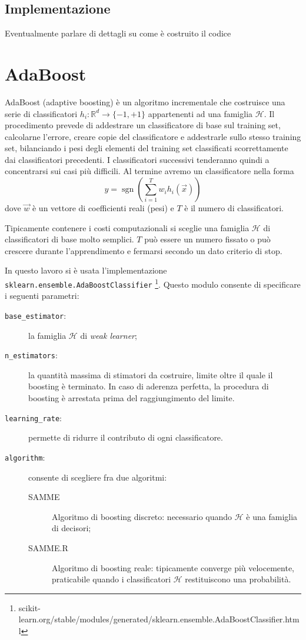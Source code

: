 \documentclass[12pt,a4paper,oneside,hidelinks]{report}
\DeclareMathOperator{\sgn}{sgn}
\begin{document}
\subsection{Implementazione}
Eventualmente parlare di dettagli su come è costruito il codice

\section{AdaBoost}
AdaBoost (adaptive boosting) è un algoritmo incrementale che costruisce una serie di classificatori $ h_{i}:\mathbb{R}^{d}\rightarrow \{-1,+1\} $ appartenenti ad una famiglia $ \mathcal{H} $. 
Il procedimento prevede di addestrare un classificatore di base sul training set, calcolarne l'errore, creare copie del classificatore e addestrarle sullo stesso training set, bilanciando i pesi degli elementi del training set classificati scorrettamente dai classificatori precedenti. I classificatori successivi tenderanno quindi a concentrarsi sui casi più difficili.
Al termine avremo un classificatore nella forma
\[\hat{y}=\sgn(\sum_{i=1}^{T} w_{i}h_{i}(\vec{x}))\]
dove $ \vec{w} $ è un vettore di coefficienti reali (pesi) e $ T $ è il numero di classificatori.

Tipicamente contenere i costi computazionali si sceglie una famiglia $ \mathcal{H} $ di classificatori di base molto semplici. $ T $ può essere un numero fissato o può crescere durante l'apprendimento e fermarsi secondo un dato criterio di stop.

In questo lavoro si è usata l'implementazione \texttt{sklearn.ensemble.AdaBoostClassifier}
\footnote{scikit-learn.org/stable/modules/generated/sklearn.ensemble.AdaBoostClassifier.html}.
Questo modulo consente di specificare i seguenti parametri:

\begin{description}
\item[\texttt{base\_estimator}:]la famiglia $ \mathcal{H} $ di \emph{weak learner};
\item[\texttt{n\_estimators}:]la quantità massima di stimatori da costruire, limite oltre il quale il boosting è terminato.
In caso di aderenza perfetta, la procedura di boosting è arrestata prima del raggiungimento del limite.
\item[\texttt{learning\_rate}:] permette di ridurre il contributo di ogni classificatore.
\item[\texttt{algorithm}:]consente di scegliere fra due algoritmi:
\begin{description}
\item[SAMME]Algoritmo di boosting discreto: necessario quando $ \mathcal{H} $ è una famiglia di decisori;
\item[SAMME.R]Algoritmo di boosting reale: tipicamente converge più velocemente, praticabile quando i classificatori $ \mathcal{H} $ restituiscono una probabilità.
\end{description}
\end{description}
 
\end{document}

